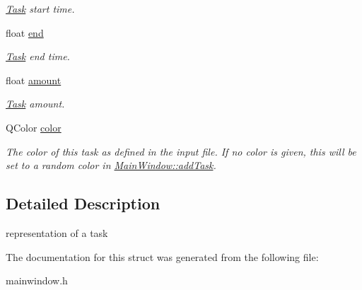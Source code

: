 \begin{DoxyCompactItemize}
\begin{DoxyCompactList}\small\item\em \hyperlink{struct_task}{Task} start time. \end{DoxyCompactList}\item 
\hypertarget{struct_task_a06201963cfc33c4efa69ba0321f96ae3}{}float \hyperlink{struct_task_a06201963cfc33c4efa69ba0321f96ae3}{end}\label{struct_task_a06201963cfc33c4efa69ba0321f96ae3}

\begin{DoxyCompactList}\small\item\em \hyperlink{struct_task}{Task} end time. \end{DoxyCompactList}\item 
\hypertarget{struct_task_a5969422039af2c60268de4df34018a92}{}float \hyperlink{struct_task_a5969422039af2c60268de4df34018a92}{amount}\label{struct_task_a5969422039af2c60268de4df34018a92}

\begin{DoxyCompactList}\small\item\em \hyperlink{struct_task}{Task} amount. \end{DoxyCompactList}\item 
\hypertarget{struct_task_a2f697912e846f50b1719bcc8dece716b}{}Q\+Color \hyperlink{struct_task_a2f697912e846f50b1719bcc8dece716b}{color}\label{struct_task_a2f697912e846f50b1719bcc8dece716b}

\begin{DoxyCompactList}\small\item\em The color of this task as defined in the input file. If no color is given, this will be set to a random color in \hyperlink{class_main_window_a2920d5c6c64925cb5f87c7fdac3f54b0}{Main\+Window\+::add\+Task}. \end{DoxyCompactList}\end{DoxyCompactItemize}


\subsection{Detailed Description}
representation of a task 

The documentation for this struct was generated from the following file\+:\begin{DoxyCompactItemize}
\item 
mainwindow.\+h\end{DoxyCompactItemize}
